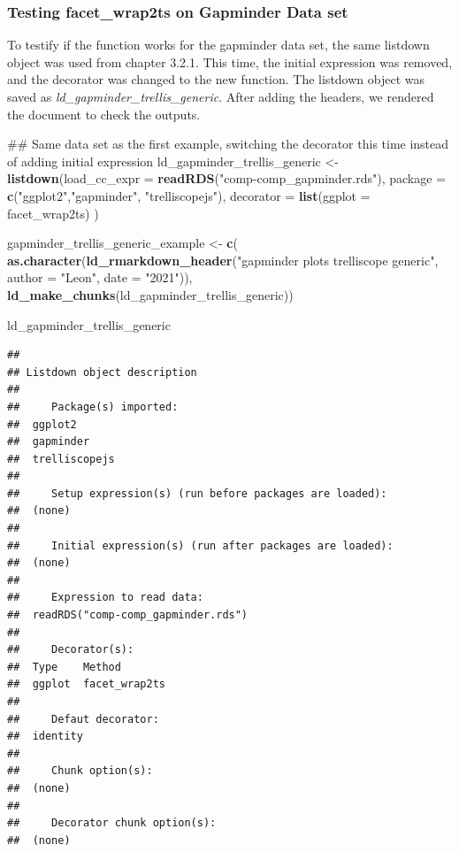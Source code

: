 \documentclass[
]{article}
\newenvironment{Shaded}{\begin{snugshade}}{\end{snugshade}}
\newcommand{\CommentTok}[1]{\textcolor[rgb]{0.54,0.53,0.53}{#1}}
\newcommand{\DataTypeTok}[1]{\textcolor[rgb]{0.00,0.34,0.68}{#1}}
\newcommand{\KeywordTok}[1]{\textcolor[rgb]{0.12,0.11,0.11}{\textbf{#1}}}
\newcommand{\NormalTok}[1]{\textcolor[rgb]{0.12,0.11,0.11}{#1}}
\newcommand{\StringTok}[1]{\textcolor[rgb]{0.75,0.01,0.01}{#1}}
\begin{document}
\hypertarget{testing-facet_wrap2ts-on-gapminder-data-set}{%
\subsubsection{Testing facet\_wrap2ts on Gapminder Data
set}\label{testing-facet_wrap2ts-on-gapminder-data-set}}

To testify if the function works for the gapminder data set, the same
listdown object was used from chapter 3.2.1. This time, the initial
expression was removed, and the decorator was changed to the new
function. The listdown object was saved as
\emph{ld\_gapminder\_trellis\_generic}. After adding the headers, we
rendered the document to check the outputs.

\begin{Shaded}
\begin{Highlighting}[]
\CommentTok{\#\# Same data set as the first example, switching the decorator this time instead of adding initial expression}
\NormalTok{ld\_gapminder\_trellis\_generic \textless{}{-}}
\StringTok{  }\KeywordTok{listdown}\NormalTok{(}\DataTypeTok{load\_cc\_expr =} \KeywordTok{readRDS}\NormalTok{(}\StringTok{"comp{-}comp\_gapminder.rds"}\NormalTok{),}
                \DataTypeTok{package =} \KeywordTok{c}\NormalTok{(}\StringTok{"ggplot2"}\NormalTok{,}\StringTok{"gapminder"}\NormalTok{, }\StringTok{"trelliscopejs"}\NormalTok{),}
              \DataTypeTok{decorator =} \KeywordTok{list}\NormalTok{(}\DataTypeTok{ggplot =}\NormalTok{ facet\_wrap2ts)}
\NormalTok{  )}

\NormalTok{gapminder\_trellis\_generic\_example \textless{}{-}}\StringTok{ }\KeywordTok{c}\NormalTok{(}
 \KeywordTok{as.character}\NormalTok{(}\KeywordTok{ld\_rmarkdown\_header}\NormalTok{(}\StringTok{"gapminder plots trelliscope generic"}\NormalTok{,}
              \DataTypeTok{author =} \StringTok{"Leon"}\NormalTok{, }\DataTypeTok{date =} \StringTok{"2021"}\NormalTok{)), }\KeywordTok{ld\_make\_chunks}\NormalTok{(ld\_gapminder\_trellis\_generic))}

\NormalTok{ld\_gapminder\_trellis\_generic}
\end{Highlighting}
\end{Shaded}

\begin{verbatim}
## 
## Listdown object description
## 
##     Package(s) imported:
##  ggplot2
##  gapminder
##  trelliscopejs
## 
##     Setup expression(s) (run before packages are loaded):
##  (none)
## 
##     Initial expression(s) (run after packages are loaded):
##  (none)
## 
##     Expression to read data:
##  readRDS("comp-comp_gapminder.rds")
## 
##     Decorator(s):
##  Type    Method
##  ggplot  facet_wrap2ts
## 
##     Defaut decorator:
##  identity
## 
##     Chunk option(s):
##  (none)
## 
##     Decorator chunk option(s):
##  (none)
\end{verbatim}
\end{document}

